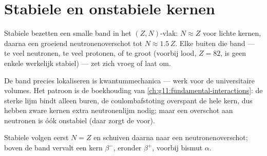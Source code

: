 \section{Stabiele en onstabiele kernen}

\begin{proposition}\label{prop:g11:nucleus-radioactivity:valley}
Stabiele  bezetten een smalle band in het $(Z, N)$-vlak:
$N \approx Z$ voor lichte kernen, daarna een groeiend neutronenoverschot
tot $N \approx 1.5\,Z$. Elke  buiten die band --- te veel
neutronen, te veel protonen, of te groot (voorbij lood, $Z = 82$, is geen
enkele  werkelijk stabiel) --- zet zich vroeg of laat om.
\end{proposition}
\admitted

\begin{remark}
De band precies lokaliseren is kwantummechanica --- werk voor de
universitaire volumes. Het patroon is de boekhouding van
\cref{ch:g11:fundamental-interactions}: de sterke lijm bindt alleen buren,
de coulombafstoting overspant de hele kern, dus hebben zware kernen extra
neutronenlijm nodig; maar een overschot aan neutronen is óók onstabiel
(daar zorgt de  voor).
\end{remark}

\begin{omfigure}

{\small Stabiele  volgen eerst $N = Z$ en schuiven daarna naar een
neutronenoverschot; boven de band vervalt een kern $\beta^-$, eronder
$\beta^+$, voorbij bismut $\alpha$.}
\end{omfigure}

